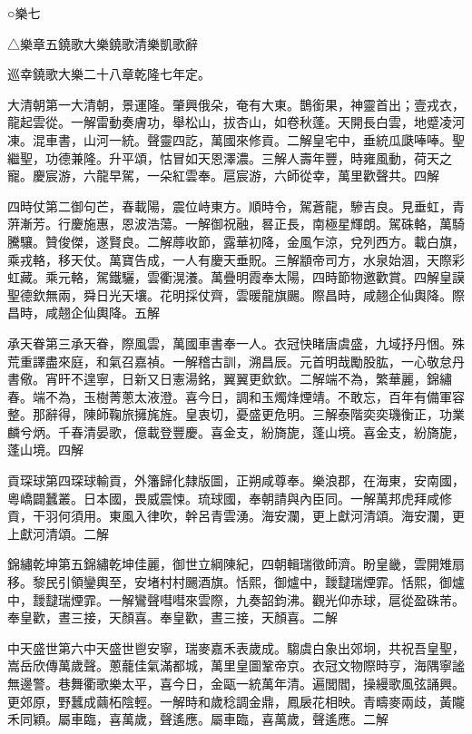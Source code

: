 
\begin{pinyinscope}
○樂七

△樂章五鐃歌大樂鐃歌清樂凱歌辭

巡幸鐃歌大樂二十八章乾隆七年定。

大清朝第一大清朝，景運隆。肇興俄朵，奄有大東。鵲銜果，神靈首出；壹戎衣，龍起雲從。一解雷動奏膚功，舉松山，拔杏山，如卷秋蓬。天開長白雲，地蹙凌河凍。混車書，山河一統。聲靈四訖，萬國來修貢。二解皇宅中，垂統瓜瓞唪唪。聖繼聖，功德兼隆。升平頌，怙冒如天恩澤濃。三解人壽年豐，時雍風動，荷天之寵。慶宸游，六龍早駕，一朵紅雲奉。扈宸游，六師從幸，萬里歡聲共。四解

四時仗第二御句芒，春載陽，震位峙東方。順時令，駕蒼龍，驂吉良。見垂虹，青蓱漸芳。行慶施惠，恩波浩蕩。一解御祝融，晷正長，南極星輝朗。駕硃輅，萬騎騰驤。贊俊傑，遂賢良。二解蓐收節，露華初降，金風乍涼，兌列西方。載白旗，乘戎輅，移天仗。萬寶告成，一人有慶天垂貺。三解顓帝司方，水泉始涸，天際彩虹藏。乘元輅，駕鐵驪，雲衢滉瀁。萬疊明霞奉太陽，四時節物邀歡賞。四解皇謨聖德欽無兩，舜日光天壤。花明採仗齊，雲暖龍旗颺。際昌時，咸翹企仙輿降。際昌時，咸翹企仙輿降。五解

承天眷第三承天眷，際風雲，萬國車書奉一人。衣冠快睹唐虞盛，九域抒丹悃。殊荒重譯盡來庭，和氣召嘉禎。一解稽古訓，溯昌辰。元首明哉勵股肱，一心敬怠丹書儆。宵旰不遑寧，日新又日憲湯銘，翼翼更欽欽。二解端不為，繁華麗，錦繡春。端不為，玉樹菁蔥太液澄。喜今日，調和玉燭烽煙靖。不敢忘，百年有備軍容整。那辭得，陳師鞠旅擁旄旌。皇衷切，憂盛更危明。三解泰階奕奕璣衡正，功業麟兮炳。千春清晏歌，億載登豐慶。喜金支，紛旖旎，蓬山境。喜金支，紛旖旎，蓬山境。四解

貢琛球第四琛球輸貢，外籓歸化隸版圖，正朔咸尊奉。樂浪郡，在海東，安南國，粵嶠闢蠶叢。日本國，畏威震悚。琉球國，奉朝請與內臣同。一解萬邦虎拜咸修貢，干羽何須用。東風入律吹，幹呂青雲湧。海安瀾，更上獻河清頌。海安瀾，更上獻河清頌。二解

錦繡乾坤第五錦繡乾坤佳麗，御世立綱陳紀，四朝輯瑞徵師濟。盼皇畿，雲開雉扇移。黎民引領鑾輿至，安堵村村颺酒旗。恬熙，御爐中，靉靆瑞煙霏。恬熙，御爐中，靉靆瑞煙霏。一解鸞聲嘒嘒來雲際，九奏韶鈞沸。觀光仰赤球，扈從盈硃芾。奉皇歡，晝三接，天顏喜。奉皇歡，晝三接，天顏喜。二解

中天盛世第六中天盛世鬯安寧，瑞麥嘉禾表歲成。騶虞白象出郊坰，共祝吾皇聖，嵩岳欣傳萬歲聲。蔥蘢佳氣滿都城，萬里皇圖鞏帝京。衣冠文物際時亨，海隅寧謐無邊警。巷舞衢歌樂太平，喜今日，金甌一統萬年清。遍閭閻，操縵歌風弦誦興。更郊原，野蠶成繭柘陰輕。一解時和歲稔調金鼎，鳳扆花相映。青疇麥兩歧，黃隴禾同穎。屬車臨，喜萬歲，聲遙應。屬車臨，喜萬歲，聲遙應。二解


\end{pinyinscope}

